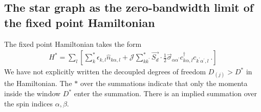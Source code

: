 \documentclass[reprint,prb,superscriptaddress]{revtex4-2}
\begin{document}
\subsection{The star graph as the zero-bandwidth limit of the fixed point Hamiltonian}
\label{sec:star graph}
The fixed point Hamiltonian takes the form
\begin{equation}\begin{aligned}
	H^* = \sum_l\left[ \sum^*_{k}\epsilon_{k,l} \hat n_{k\alpha,l} + {\mathcal{J}}\sum_{kk^\prime}^* \vec{S_d}\cdot\frac{1}{2}\vec{\sigma}_{\alpha\alpha^\prime}c_{k\alpha,l}^\dagger c_{k^\prime\alpha^\prime, l}~.\right]
\end{aligned}\end{equation}
We have not explicitly written the decoupled degrees of freedom \(D_{(j)} > D^*\) in the Hamiltonian. The \(*\) over the summations indicate that only the momenta inside the window \(D^*\) enter the summation. There is an implied summation over the spin indices \(\alpha,\beta\).
\end{document}

